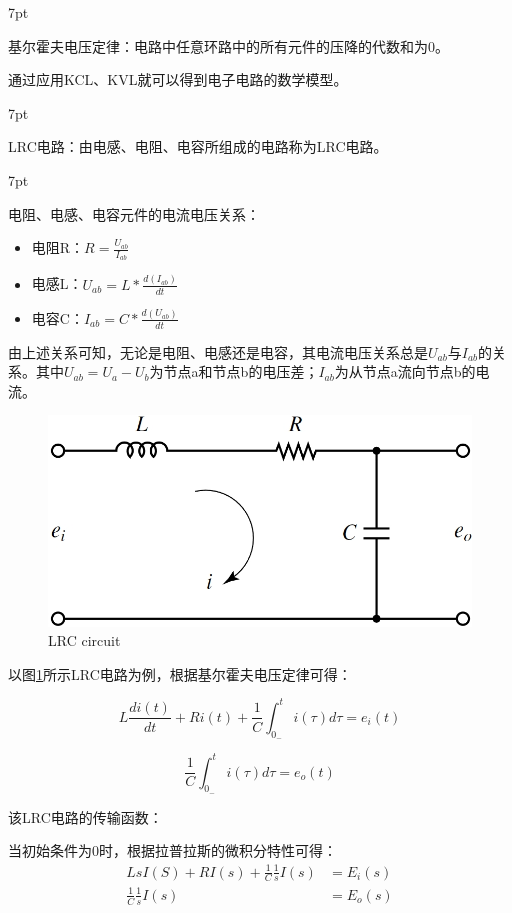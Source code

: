 \documentclass{article}
\numberwithin{equation}{section}
\numberwithin{figure}{section}
\newenvironment{formal}{%
\def\FrameCommand{%
\hspace{1pt}%
{\color{DarkBlue}\vrule width 2pt}%
{\color{formalshade}\vrule width 4pt}%
\colorbox{formalshade}%
}%
\MakeFramed{\advance\hsize-\width\FrameRestore}%
\noindent\hspace{-4.55pt}%
\begin{adjustwidth}{}{7pt}%
\vspace{2pt}\vspace{2pt}%
}
{%
\vspace{2pt}\end{adjustwidth}\endMakeFramed%
}
\begin{document}
\begin{formal}
    基尔霍夫电压定律：电路中任意环路中的所有元件的压降的代数和为0。
\end{formal}

通过应用KCL、KVL就可以得到电子电路的数学模型。

\begin{formal}
    LRC电路：由电感、电阻、电容所组成的电路称为LRC电路。
\end{formal}

\begin{formal}
    电阻、电感、电容元件的电流电压关系：
    \begin{itemize}
        \item 电阻R：$R=\frac{U_{ab}}{I_{ab}}$
        \item 电感L：$U_{ab}=L*\frac{d(I_{ab})}{dt}$
        \item 电容C：$I_{ab}=C*\frac{d(U_{ab})}{dt}$
    \end{itemize}
    由上述关系可知，无论是电阻、电感还是电容，其电流电压关系总是$U_{ab}$与$I_{ab}$的关系。其中$U_{ab}=U_{a}-U_{b}$为节点a和节点b的电压差；$I_{ab}$为从节点a流向节点b的电流。
\end{formal}

\begin{figure}
    \centering
    \includegraphics[width=.4\textwidth]{Chapter3/LRCcircuit.png} %
    \caption{LRC circuit} %
    \label{LRCcircuit} %
\end{figure}

以图\ref{LRCcircuit}所示LRC电路为例，根据基尔霍夫电压定律可得：

\begin{equation}
    L\frac{di(t)}{dt}+Ri(t)+\frac{1}{C}\int_{0_-}^{t}{i(\tau)d\tau}=e_i(t)
\end{equation}

\begin{equation}
    \frac{1}{C}\int_{0_-}^{t}{i(\tau)d\tau}=e_o(t)
\end{equation}

该LRC电路的传输函数：

当初始条件为0时，根据拉普拉斯的微积分特性可得：
\begin{equation}
    \begin{split}
        LsI(S)+RI(s)+\frac{1}{C}\frac{1}{s}I(s)&=E_i(s) \\
        \frac{1}{C}\frac{1}{s}I(s)&=E_o(s)
    \end{split}
\end{equation}
\end{document}
